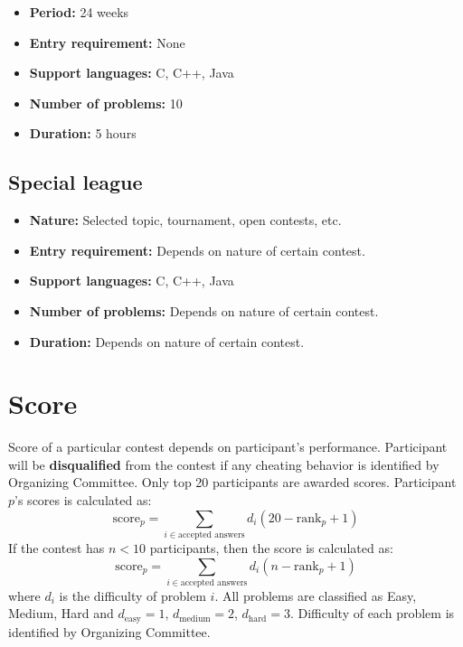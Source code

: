 \documentclass{article}
\begin{document}
\begin{itemize}
	\item \textbf{Period:} 24 weeks
	\item \textbf{Entry requirement:} None
	\item \textbf{Support languages:} C, C++, Java
	\item \textbf{Number of problems:} 10
	\item \textbf{Duration:} 5 hours
\end{itemize}

\subsection{Special league}

\begin{itemize}
	\item \textbf{Nature:} Selected topic, tournament, open contests, etc.
	\item \textbf{Entry requirement:} Depends on nature of certain contest.
	\item \textbf{Support languages:} C, C++, Java
	\item \textbf{Number of problems:} Depends on nature of certain contest.
	\item \textbf{Duration:} Depends on nature of certain contest.
\end{itemize}

\section{Score}

Score of a particular contest depends on participant's performance. Participant will be \textbf{disqualified} from the contest if any cheating behavior is identified by Organizing Committee. Only top 20 participants are awarded scores. Participant $p$'s scores is calculated as:
\begin{equation*}
	\text{score}_{p}=\sum_{i\in\text{accepted answers}}d_{i}(20-\text{rank}_{p}+1)
\end{equation*}
If the contest has $n<10$ participants, then the score is calculated as:
\begin{equation*}
	\text{score}_{p}=\sum_{i\in\text{accepted answers}}d_{i}(n-\text{rank}_{p}+1)
\end{equation*}
where $d_{i}$ is the difficulty of problem $i$. All problems are classified as Easy, Medium, Hard and $d_{\text{easy}}=1$, $d_{\text{medium}}=2$, $d_{\text{hard}}=3$. Difficulty of each problem is identified by Organizing Committee.
\end{document}
